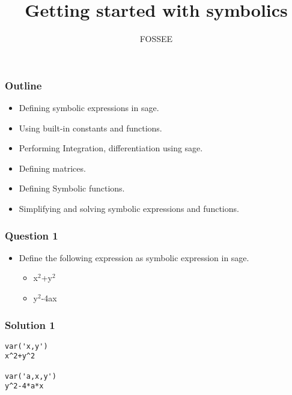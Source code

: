 \documentclass[presentation]{beamer}
\title{Getting started with symbolics}
\author{FOSSEE}
\date{}
\begin{document}
\maketitle









\begin{frame}
\frametitle{Outline}
\label{sec-1}

\begin{itemize}
\item Defining symbolic expressions in sage.
\item Using built-in constants and functions.
\item Performing Integration, differentiation using sage.
\item Defining matrices.
\item Defining Symbolic functions.
\item Simplifying and solving symbolic expressions and functions.
\end{itemize}
\end{frame}
\begin{frame}
\frametitle{Question 1}
\label{sec-2}

\begin{itemize}
\item Define the following expression as symbolic
    expression in sage.

\begin{itemize}
\item x$^2$+y$^2$
\item y$^2$-4ax
\end{itemize}

\end{itemize}

  
\end{frame}
\begin{frame}[fragile]
\frametitle{Solution 1}
\label{sec-3}

\lstset{language=Python}
\begin{lstlisting}
var('x,y')
x^2+y^2

var('a,x,y')
y^2-4*a*x
\end{lstlisting}
\end{frame}
\end{document}
